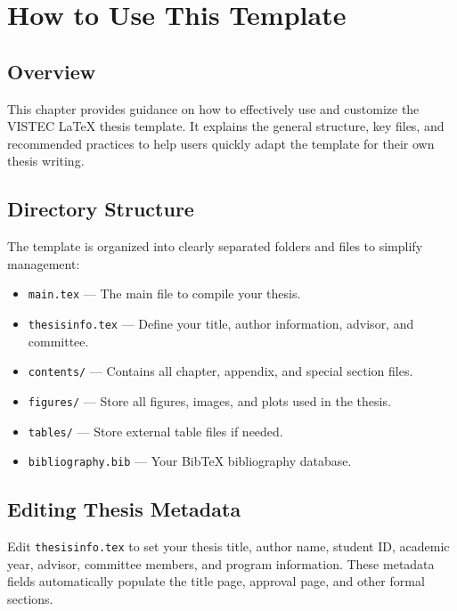 \chapter{How to Use This Template}
\label{chapter2}

\section{Overview}
\begin{paragraph}
This chapter provides guidance on how to effectively use and customize the VISTEC {\LaTeX} thesis template. It explains the general structure, key files, and recommended practices to help users quickly adapt the template for their own thesis writing.
\end{paragraph}

\section{Directory Structure}
\begin{paragraph}
The template is organized into clearly separated folders and files to simplify management:

\begin{itemize}[leftmargin=\paritemindent]
    \item \texttt{main.tex} — The main file to compile your thesis.
    \item \texttt{thesisinfo.tex} — Define your title, author information, advisor, and committee.
    \item \texttt{contents/} — Contains all chapter, appendix, and special section files.
    \item \texttt{figures/} — Store all figures, images, and plots used in the thesis.
    \item \texttt{tables/} — Store external table files if needed.
    \item \texttt{bibliography.bib} — Your BibTeX bibliography database.
\end{itemize}
\end{paragraph}

\section{Editing Thesis Metadata}
\begin{paragraph}
Edit \texttt{thesisinfo.tex} to set your thesis title, author name, student ID, academic year, advisor, committee members, and program information. These metadata fields automatically populate the title page, approval page, and other formal sections.
\end{paragraph}

